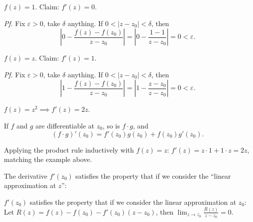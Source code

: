 \documentclass[11pt]{article}
\begin{document}
\begin{example}
$f(z) = 1$. Claim: $f'(z) = 0$.

\emph{Pf.} Fix $\varepsilon > 0$, take $\delta$ anything. If $0 < |z-z_0| < \delta$, then
\[
\left|0 - \frac{f(z)-f(z_0)}{z-z_0}\right| = \left|0 - \frac{1-1}{z-z_0}\right| = 0 < \varepsilon.
\]
\end{example}

\begin{example}
$f(z) = z$. Claim: $f'(z) = 1$.

\emph{Pf.} Fix $\varepsilon > 0$, take $\delta$ anything. If $0 < |z-z_0| < \delta$, then
\[
\left|1 - \frac{f(z)-f(z_0)}{z-z_0}\right| = \left|1 - \frac{z-z_0}{z-z_0}\right| = 0 < \varepsilon.
\]
\end{example}

\begin{example}
$f(z) = z^2 \implies f'(z) = 2z$.
\end{example}

\begin{theorem}
If $f$ and $g$ are differentiable at $z_0$, so is $f\cdot g$, and
\[
(f\cdot g)'(z_0) = f'(z_0)g(z_0) + f(z_0)g'(z_0).
\]
\end{theorem}

Applying the product rule inductively with $f(z)=z$: $f'(z) = z\cdot 1 + 1\cdot z = 2z$, matching the example above.

\begin{remark}
The derivative $f'(z_0)$ satisfies the property that if we consider the ``linear approximation at $z$'':
\end{remark}

\begin{theorem}
$f'(z_0)$ satisfies the property that if we consider the linear approximation at $z_0$:
Let $R(z) = f(z) - f(z_0) - f'(z_0)(z - z_0)$, then $\lim_{z \to z_0} \frac{R(z)}{z - z_0} = 0$.
\end{theorem}
\end{document}
